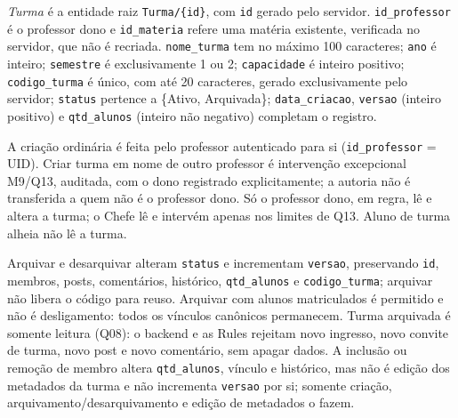 \begin{regra}
\textit{Turma} é a entidade raiz \texttt{Turma/\{id\}}, com \texttt{id} gerado
pelo servidor. \texttt{id\_professor} é o professor dono e \texttt{id\_materia}
refere uma matéria existente, verificada no servidor, que não é recriada.
\texttt{nome\_turma} tem no máximo 100 caracteres; \texttt{ano} é inteiro;
\texttt{semestre} é exclusivamente 1 ou 2; \texttt{capacidade} é inteiro
positivo; \texttt{codigo\_turma} é único, com até 20 caracteres, gerado
exclusivamente pelo servidor; \texttt{status} pertence a \{Ativo, Arquivada\};
\texttt{data\_criacao}, \texttt{versao} (inteiro positivo) e \texttt{qtd\_alunos}
(inteiro não negativo) completam o registro.

A criação ordinária é feita pelo professor autenticado para si
(\texttt{id\_professor} = UID). Criar turma em nome de outro professor é
intervenção excepcional M9/Q13, auditada, com o dono registrado explicitamente;
a autoria não é transferida a quem não é o professor dono. Só o professor dono,
em regra, lê e altera a turma; o Chefe lê e intervém apenas nos limites de Q13.
Aluno de turma alheia não lê a turma.

Arquivar e desarquivar alteram \texttt{status} e incrementam \texttt{versao},
preservando \texttt{id}, membros, posts, comentários, histórico,
\texttt{qtd\_alunos} e \texttt{codigo\_turma}; arquivar não libera o código para
reuso. Arquivar com alunos matriculados é permitido e não é desligamento:
todos os vínculos canônicos permanecem. Turma arquivada é somente leitura
(Q08): o backend e as Rules rejeitam novo ingresso, novo convite de turma, novo
post e novo comentário, sem apagar dados. A inclusão ou remoção de membro
altera \texttt{qtd\_alunos}, vínculo e histórico, mas não é edição dos metadados
da turma e não incrementa \texttt{versao} por si; somente criação,
arquivamento/desarquivamento e edição de metadados o fazem.
\end{regra}

